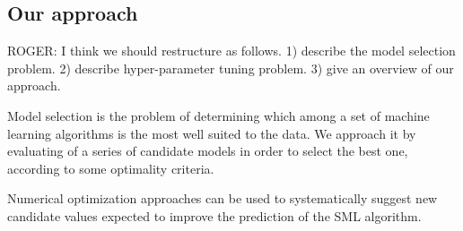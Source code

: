 \subsection{Our approach}

ROGER: I think we should restructure as follows. 1) describe the model selection problem. 2) describe hyper-parameter tuning problem. 3) give an overview of our approach.

Model selection is the problem of determining which among a set of machine learning algorithms is the most well suited to the data. We approach it by evaluating of a series of candidate models in order to select the best one, according to some optimality criteria. 

Numerical optimization approaches can be used to systematically suggest new candidate values expected to improve the prediction of the SML algorithm.
